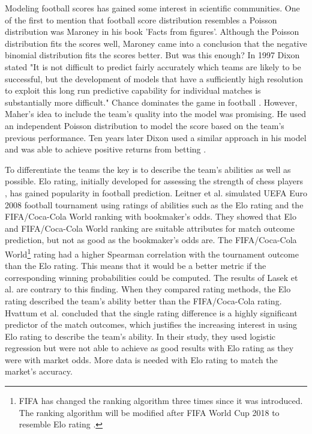 Modeling football scores has gained some interest in scientific communities. One of the first to mention that football score distribution resembles a Poisson distribution was Maroney \cite{moroney1962facts} in his book 'Facts from figures'. Although the Poisson distribution fits the scores well, Maroney came into a conclusion that the negative binomial distribution fits the scores better. But was this enough? In 1997 Dixon stated \cite{dixon1997} "It is not difficult to predict fairly accurately which teams are likely to be successful, but the development of models that have a sufficiently high resolution to exploit this long run predictive capability for individual matches is substantially more difficult." Chance dominates the game in football \cite{ben2006parity}. However, Maher's \cite{maher1982modelling} idea to include the team's quality into the model was promising. He used an independent Poisson distribution to model the score based on the team's previous performance. Ten years later Dixon used a similar approach in his model and was able to achieve positive returns from betting \cite{dixon1997}.

To differentiate the teams the key is to describe the team's abilities as well as possible. Elo rating, initially developed for assessing the strength of chess players \cite{elo1978rating}, has gained popularity in football prediction. Leitner et al.\cite{leitner2010forecasting} simulated UEFA Euro 2008 football tournament using ratings of abilities such as the Elo rating and the FIFA/Coca-Cola World ranking with bookmaker's odds. They showed that Elo and FIFA/Coca-Cola World ranking are suitable attributes for match outcome prediction, but not as good as the bookmaker's odds are. The FIFA/Coca-Cola World\footnote{FIFA has changed the ranking algorithm three times since it was introduced. The ranking algorithm will be modified after FIFA World Cup 2018 to resemble Elo rating \cite{wiki:fifarating}.} rating had a higher Spearman correlation with the tournament outcome than the Elo rating. This means that it would be a better metric if the corresponding winning probabilities could be computed. \cite{leitner2010forecasting} The results of Lasek et al. \cite{lasek2013predictive} are contrary to this finding. When they compared rating methods, the Elo rating described the team's ability better than the FIFA/Coca-Cola rating. Hvattum et al. \cite{hvattum2010using} concluded that the single rating difference is a highly significant predictor of the match outcomes, which justifies the increasing interest in using Elo rating to describe the team's ability. In their study, they used logistic regression but were not able to achieve as good results with Elo rating as they were with market odds. More data is needed with Elo rating to match the market's accuracy.

